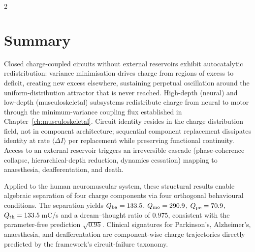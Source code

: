 \begin{multicols}{2}

\section*{Summary}

Closed charge-coupled circuits without external reservoirs exhibit
autocatalytic redistribution: variance minimisation drives charge from
regions of excess to deficit, creating new excess elsewhere, sustaining
perpetual oscillation around the uniform-distribution attractor that is
never reached.  High-depth (neural) and low-depth (musculoskeletal)
subsystems redistribute charge from neural to motor through the
minimum-variance coupling flux established in
Chapter~\ref{ch:musculoskeletal}.  Circuit identity resides in the charge
distribution field, not in component architecture; sequential component
replacement dissipates identity at rate $\langle\Delta I\rangle$ per
replacement while preserving functional continuity.  Access to an external
reservoir triggers an irreversible cascade (phase-coherence collapse,
hierarchical-depth reduction, dynamics cessation) mapping to anaesthesia,
deafferentation, and death.

Applied to the human neuromuscular system, these structural results enable
algebraic separation of four charge components via four orthogonal behavioural
conditions.  The separation yields $Q_{\mathrm{ba}} = 133.5$, $Q_{\mathrm{mo}} = 290.9$,
$Q_{\mathrm{pe}} = 70.9$, $Q_{\mathrm{th}} = 133.5$\,mC/s and a dream--thought ratio of $0.975$,
consistent with the parameter-free prediction $\sqrt{0.95}$.  Clinical
signatures for Parkinson's, Alzheimer's, anaesthesia, and deafferentation are
component-wise charge trajectories directly predicted by the framework's
circuit-failure taxonomy.

\end{multicols}
